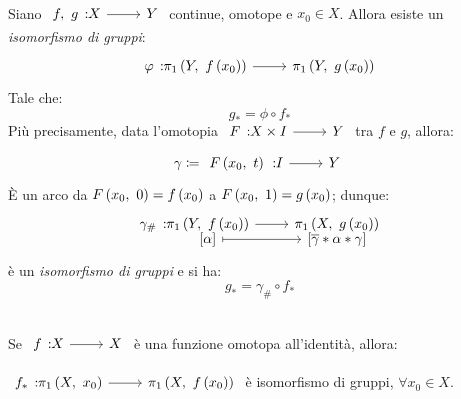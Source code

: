 \begin{theorema}~{}\\
Siano $\funz{f,\ g}{X}{Y}$ continue, omotope e $x_0\in X$. Allora esiste un \textit{isomorfismo di gruppi}:
\begin{equation}
	\funz{\phi}{\gruf{Y}{f\left(x_0\right)}}{\gruf{Y}{g\left(x_0\right)}}
\end{equation}
Tale che:
\begin{equation}
	g_{\ast}=\phi\circ f_{\ast}
\end{equation}
Più precisamente, data l'omotopia $\funz{F}{X\times I}{Y}$ tra $f$ e $g$, allora:
\begin{equation}
\gamma\coloneqq \funz{\mvf{F}{x_0}{t}}{I}{Y}
\end{equation}
È un arco da $F\left(x_0,\ 0\right)=f\left(x_0\right)$ a $F\left(x_0,\ 1\right)=g\left(x_0\right)$; dunque:
\begin{equation}
	\funztot{\gamma_{\#}}{\gruf{Y}{f\left(x_0\right)}}{\gruf{X}{g\left(x_0\right)}}{\left[\alpha\right]}{\left[\overline{\gamma}\ast\alpha\ast\gamma\right]}
\end{equation}
è un \textit{isomorfismo di gruppi} e si ha:
\begin{equation}
	g_{\ast}=\gamma_{\#}\circ f_{\ast}
\end{equation}
\begin{center}
\end{center}
\vspace{-6mm}
\end{theorema}
\begin{corollary}~{}\\
	Se $\funz{f}{X}{X}$ è una funzione omotopa all'identità, allora: \begin{center}
		$\funz{f_{\ast}}{\gruf{X}{x_0}}{\gruf{X}{f\left(x_0\right)}}$ è isomorfismo di gruppi, $\forall x_0\in X$.
	\end{center}
\vspace{-3mm}
\end{corollary}

